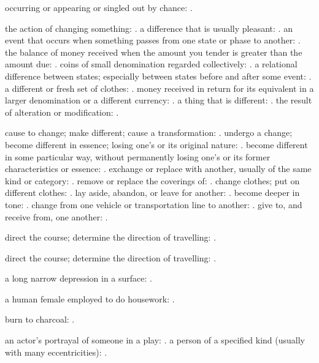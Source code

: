   occurring or appearing or singled out by chance: .

  the action of changing something: . a difference that is usually pleasant: . an event that occurs when something passes from one state or phase to another: . the balance of money received when the amount you tender is greater than the amount due: . coins of small denomination regarded collectively: . a relational difference between states; especially between states before and after some event: . a different or fresh set of clothes: . money received in return for its equivalent in a larger denomination or a different currency: . a thing that is different: . the result of alteration or modification: .

  cause to change; make different; cause a transformation: . undergo a change; become different in essence; losing one's or its original nature: . become different in some particular way, without permanently losing one's or its former characteristics or essence: . exchange or replace with another, usually of the same kind or category: . remove or replace the coverings of: . change clothes; put on different clothes: . lay aside, abandon, or leave for another: . become deeper in tone: . change from one vehicle or transportation line to another: . give to, and receive from, one another: .

  direct the course; determine the direction of travelling: .

  direct the course; determine the direction of travelling: .

  a long narrow depression in a surface: .

  a human female employed to do housework: .

  burn to charcoal: .

  an actor's portrayal of someone in a play: . a person of a specified kind (usually with many eccentricities): .

